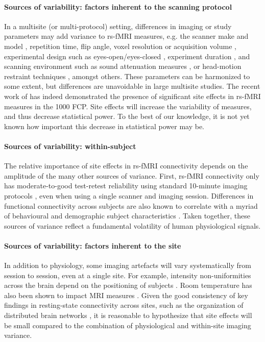 \documentclass[authoryear]{elsarticle}
\begin{document}
\paragraph{Sources of variability: factors inherent to the scanning protocol}
In a multisite (or multi-protocol) setting, differences in imaging or study parameters may add variance to rs-fMRI measures, e.g. the scanner make and model \citep{Friedman2006,Friedman2008}, repetition time, flip angle, voxel resolution or acquisition volume \citep{Friedman2006a}, experimental design such as eyes-open/eyes-closed \citep{Yan2009}, experiment duration \citep{VanDijk2010}, and scanning environment such as sound attenuation measures \citep{Elliott1999}, or head-motion restraint techniques \citep{Edward2000,VanDijk2012}, amongst others. These parameters can be harmonized to some extent, but differences are unavoidable in large multisite studies. The recent work of \cite{Yan2013a} has indeed demonstrated the presence of significant site effects in rs-fMRI measures in the 1000 FCP. Site effects will increase the variability of measures, and thus decrease statistical power. To the best of our knowledge, it is not yet known how important this decrease in statistical power may be. 

\paragraph{Sources of variability: within-subject}
The relative importance of site effects in rs-fMRI connectivity depends on the amplitude of the many other sources of variance. First, rs-fMRI connectivity only has moderate-to-good test-retest reliability using standard 10-minute imaging protocols \citep{Shehzad2009}, even when using a single scanner and imaging session. Differences in functional connectivity across subjects are also known to correlate with a myriad of behavioural and demographic subject characteristics \citep{Anand2007,Sheline2010,Kilpatrick2006}. Taken together, these sources of variance reflect a fundamental volatility of human physiological signals. 

\paragraph{Sources of variability: factors inherent to the site}
In addition to physiology, some imaging artefacts will vary systematically from session to session, even at a single site. For example, intensity non-uniformities across the brain depend on the positioning of subjects \citep{Caramanos2010}. Room temperature has also been shown to impact MRI measures \citep{Vanhoutte2006}. Given the good consistency of key findings in resting-state connectivity across sites, such as the organization of distributed brain networks \citep{Biswal2010}, it is reasonable to hypothesize that site effects will be small compared to the combination of physiological and within-site imaging variance.
\end{document}
